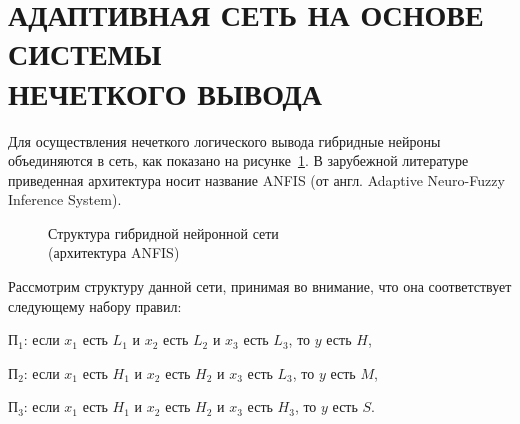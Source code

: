 \section[Адаптивная сеть на основе системы нечеткого вывода]{%
  АДАПТИВНАЯ СЕТЬ НА ОСНОВЕ СИСТЕМЫ \\
  НЕЧЕТКОГО ВЫВОДА
}

Для осуществления нечеткого логического вывода
гибридные нейроны объединяются в сеть, как показано на рисунке~\ref{fig:anfis}.
В зарубежной литературе приведенная архитектура носит название ANFIS
(от англ. Adaptive Neuro-Fuzzy Inference System).

\begin{figure}[h!]
  \centering
  \caption{Структура гибридной нейронной сети \\ (архитектура ANFIS)}
  \label{fig:anfis}
\end{figure}

Рассмотрим структуру данной сети, принимая во внимание, что она соответствует
следующему набору правил: \par
\( \text{П}_1 \): если
\( x_1 \) есть \( L_1 \) и
\( x_2 \) есть \( L_2 \) и
\( x_3 \) есть \( L_3 \),
то \( y \) есть \( H \), \par
\( \text{П}_2 \): если
\( x_1 \) есть \( H_1 \) и
\( x_2 \) есть \( H_2 \) и
\( x_3 \) есть \( L_3 \),
то \( y \) есть \( M \), \par
\( \text{П}_3 \): если
\( x_1 \) есть \( H_1 \) и
\( x_2 \) есть \( H_2 \) и
\( x_3 \) есть \( H_3 \),
то \( y \) есть \( S \).

\pagebreak

